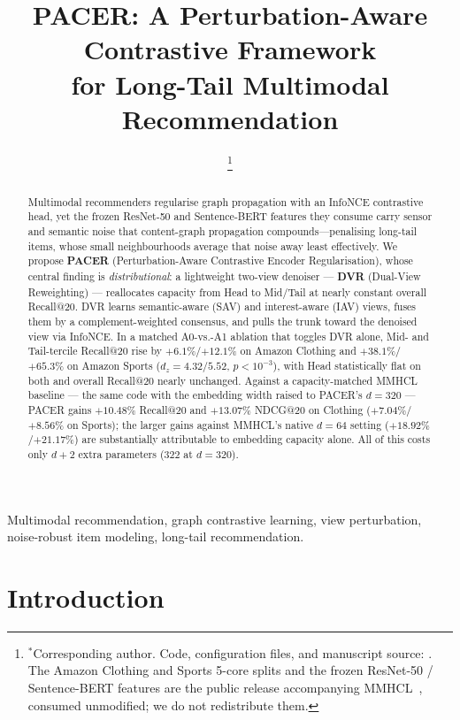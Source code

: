 \documentclass[conference]{IEEEtran}
\title{PACER: A Perturbation-Aware Contrastive Framework\\for Long-Tail Multimodal Recommendation}
\author{
\IEEEauthorblockN{Minh-Khoi Le$^{*}$}
\IEEEauthorblockA{VNU University of Engineering and Technology, Hanoi, Vietnam\\
khoilm@vnu.edu.vn}
\thanks{$^{*}$Corresponding author.
Code, configuration files, and manuscript source:
\pacergithub.
The Amazon Clothing and Sports 5-core splits and the frozen
ResNet-50 / Sentence-BERT features are the public release
accompanying MMHCL~\cite{guo2025mmhcl}, consumed unmodified;
we do not redistribute them.}
}
\newcommand{\dvr}{DVR\xspace}
\begin{document}
\maketitle

\begin{abstract}
Multimodal recommenders regularise graph propagation with an InfoNCE
contrastive head, yet the frozen ResNet-50 and Sentence-BERT features
they consume carry sensor and semantic noise that content-graph
propagation compounds---penalising long-tail items, whose small
neighbourhoods average that noise away least effectively. We propose
\textbf{PACER} (Perturbation-Aware Contrastive Encoder
Regularisation), whose central finding is
\emph{distributional}: a lightweight two-view denoiser ---
\textbf{\dvr} (Dual-View Reweighting) --- reallocates capacity from
Head to Mid/Tail at nearly constant overall Recall@20. \dvr learns semantic-aware (SAV) and interest-aware (IAV)
views, fuses them by a complement-weighted consensus, and pulls the
trunk toward the denoised view via InfoNCE. In a matched A0-vs.-A1
ablation that toggles \dvr alone, Mid- and Tail-tercile Recall@20 rise
by $+6.1\%$/$+12.1\%$ on Amazon Clothing and $+38.1\%$/$+65.3\%$ on
Amazon Sports ($d_z{=}4.32/5.52$, $p{<}10^{-3}$), with Head
statistically flat on both and overall Recall@20 nearly unchanged.
Against a capacity-matched MMHCL baseline --- the same code with the
embedding width raised to PACER's $d{=}320$ --- PACER gains
$+10.48\%$ Recall@20 and $+13.07\%$ NDCG@20 on Clothing
($+7.04\%$/$+8.56\%$ on Sports); the larger gains against MMHCL's
native $d{=}64$ setting ($+18.92\%$/$+21.17\%$) are substantially
attributable to embedding capacity alone. All of this costs only
$d{+}2$ extra parameters ($322$ at $d{=}320$).
\end{abstract}

\begin{IEEEkeywords}
Multimodal recommendation, graph contrastive learning, view perturbation,
noise-robust item modeling, long-tail recommendation.
\end{IEEEkeywords}

\section{Introduction}
\end{document}
